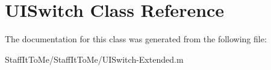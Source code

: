 \hypertarget{class_u_i_switch}{
\section{\-U\-I\-Switch \-Class \-Reference}
\label{class_u_i_switch}
}


\-The documentation for this class was generated from the following file\-:\begin{DoxyCompactItemize}
\item 
\-Staff\-It\-To\-Me/\-Staff\-It\-To\-Me/\-U\-I\-Switch-\/\-Extended.\-m\end{DoxyCompactItemize}
